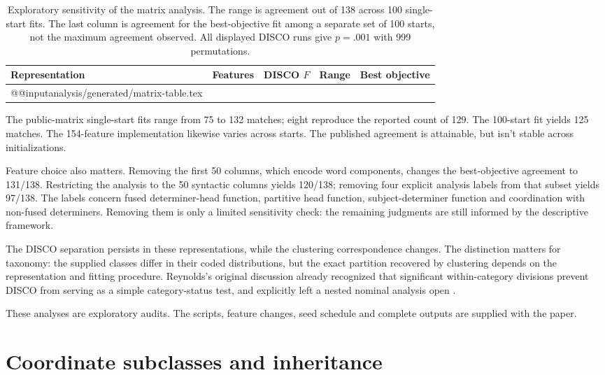 \documentclass[12pt]{article}
\makeatletter
\newcommand{\tablebody}[1]{\csname @@input\endcsname #1 }
\makeatother
\begin{document}
\begin{table}[tb]
\centering\small
\caption{Exploratory sensitivity of the matrix analysis. The range is agreement out of 138 across 100 single-start fits. The last column is agreement for the best-objective fit among a separate set of 100 starts, not the maximum agreement observed. All displayed DISCO runs give $p=.001$ with 999 permutations.}\label{tab:matrix}
\begin{tabular}{>{\raggedright\arraybackslash}p{5.1cm}rrrr}
\toprule
Representation & Features & DISCO $F$ & Range & Best objective \\
\midrule
\tablebody{analysis/generated/matrix-table.tex}
\bottomrule
\end{tabular}
\end{table}

The public-matrix single-start fits range from 75 to 132 matches; eight reproduce the reported count of 129. The 100-start fit yields 125 matches. The 154-feature implementation likewise varies across starts. The published agreement is attainable, but isn't stable across initializations.

Feature choice also matters. Removing the first 50 columns, which encode word components, changes the best-objective agreement to 131/138. Restricting the analysis to the 50 syntactic columns yields 120/138; removing four explicit analysis labels from that subset yields 97/138. The labels concern fused determiner-head function, partitive head function, subject-determiner function and coordination with non-fused determiners. Removing them is only a limited sensitivity check: the remaining judgments are still informed by the descriptive framework.

The DISCO separation persists in these representations, while the clustering correspondence changes. The distinction matters for taxonomy: the supplied classes differ in their coded distributions, but the exact partition recovered by clustering depends on the representation and fitting procedure. Reynolds's original discussion already recognized that significant within-category divisions prevent DISCO from serving as a simple category-status test, and explicitly left a nested nominal analysis open \citep{reynolds2021}.

These analyses are exploratory audits. The scripts, feature changes, seed schedule and complete outputs are supplied with the paper.

\section{Coordinate subclasses and inheritance}\label{sec:inheritance}
\end{document}
